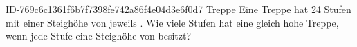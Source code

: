 \begin{exercise}
      {ID-769c6c1361f6b7f7398fe742a86f4e04d3e6f0d7}
      {Treppe}
  \ifproblem\problem
    Eine Treppe hat 24 Stufen mit einer Steighöhe von jeweils .
    Wie viele Stufen hat eine gleich hohe Treppe, wenn jede Stufe eine
    Steighöhe von  besitzt?
  \fi
\end{exercise}
